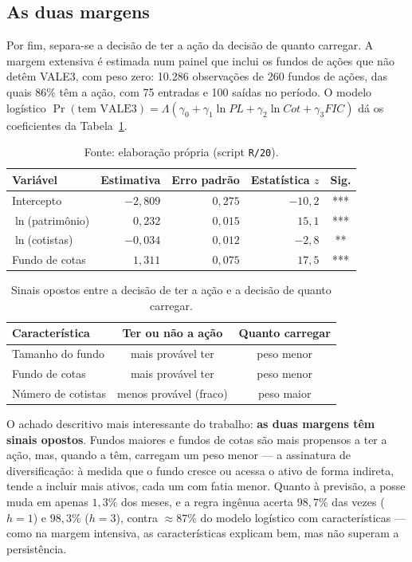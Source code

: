 \documentclass[12pt,a4paper]{article}
\begin{document}
\subsection{As duas margens}
\label{sec:margens}

Por fim, separa-se a decisão de ter a ação da decisão de quanto carregar. A margem extensiva é
estimada num painel que inclui os fundos de ações que não detêm VALE3, com peso zero: 10.286
observações de 260 fundos de ações, das quais $86\%$ têm a ação, com 75 entradas e 100 saídas no
período. O modelo logístico $\Pr(\text{tem VALE3})=\Lambda(\gamma_0+\gamma_1\ln PL+\gamma_2\ln
Cot+\gamma_3 FIC)$ dá os coeficientes da Tabela~\ref{tab:posse}.

\begin{table}[h]\centering\small
\caption{Modelo logístico da probabilidade de deter VALE3 (painel extensivo, 10.286 obs.).}
\label{tab:posse}
\begin{tabular}{@{}lrrrc@{}}
\toprule
Variável & Estimativa & Erro padrão & Estatística $z$ & Sig. \\
\midrule
Intercepto        & $-2{,}809$ & $0{,}275$ & $-10{,}2$ & *** \\
$\ln$(patrimônio) & $0{,}232$  & $0{,}015$ & $15{,}1$  & *** \\
$\ln$(cotistas)   & $-0{,}034$ & $0{,}012$ & $-2{,}8$  & ** \\
Fundo de cotas    & $1{,}311$  & $0{,}075$ & $17{,}5$  & *** \\
\bottomrule
\end{tabular}
\caption*{\footnotesize Fonte: elaboração própria (script \texttt{R/20}).}
\end{table}

\begin{table}[h]\centering\small
\caption{Sinais opostos entre a decisão de ter a ação e a decisão de quanto carregar.}
\label{tab:margens}
\begin{tabular}{@{}lcc@{}}
\toprule
Característica & Ter ou não a ação & Quanto carregar \\
\midrule
Tamanho do fundo   & mais provável ter & peso menor \\
Fundo de cotas     & mais provável ter & peso menor \\
Número de cotistas & menos provável (fraco) & peso maior \\
\bottomrule
\end{tabular}
\end{table}

O achado descritivo mais interessante do trabalho: \textbf{as duas margens têm sinais opostos}.
Fundos maiores e fundos de cotas são mais propensos a ter a ação, mas, quando a têm, carregam um
peso menor --- a assinatura de diversificação: à medida que o fundo cresce ou acessa o ativo de
forma indireta, tende a incluir mais ativos, cada um com fatia menor. Quanto à previsão, a posse
muda em apenas $1{,}3\%$ dos meses, e a regra ingênua acerta $98{,}7\%$ das vezes ($h=1$) e
$98{,}3\%$ ($h=3$), contra $\approx87\%$ do modelo logístico com características --- como na
margem intensiva, as características explicam bem, mas não superam a persistência.
\end{document}
